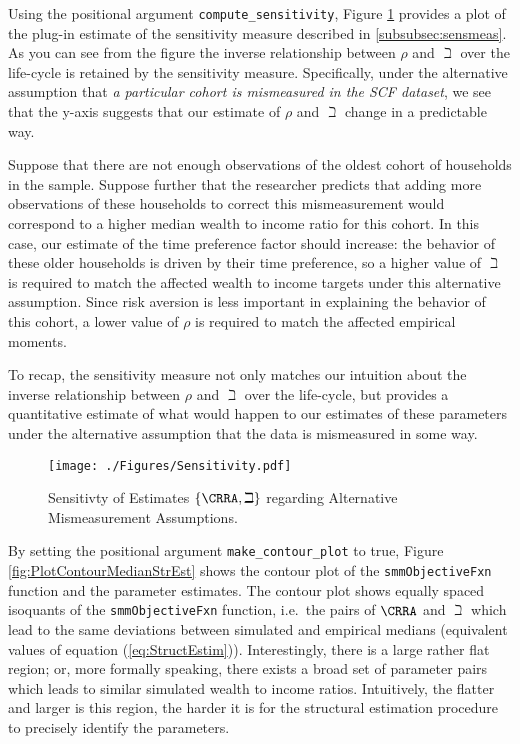 \documentclass[titlepage, headings=optiontotocandhead]{Resources/texmf-local/tex/latex/econtex}
\begin{document}
Using the positional argument \texttt{compute\_sensitivity}, Figure \ref{fig:PlotSensitivityMeasure} provides a plot of the plug-in estimate of the sensitivity measure described in \ref{subsubsec:sensmeas}. As you can see from the figure the inverse relationship between $\rho$ and $\beth$ over the life-cycle is retained by the sensitivity measure. Specifically, under the alternative assumption that \textit{a particular cohort is mismeasured in the SCF dataset}, we see that the y-axis suggests that our estimate of $\rho$ and $\beth$ change in a predictable way.

Suppose that there are not enough observations of the oldest cohort of households in the sample. Suppose further that the researcher predicts that adding more observations of these households to correct this mismeasurement would correspond to a higher median wealth to income ratio for this cohort. In this case, our estimate of the time preference factor should increase: the behavior of these older households is driven by their time preference, so a higher value of $\beth$ is required to match the affected wealth to income targets under this alternative assumption. Since risk aversion is less important in explaining the behavior of this cohort, a lower value of $\rho$ is required to match the affected empirical moments.

To recap, the sensitivity measure not only matches our intuition about the inverse relationship between $\rho$ and $\beth$ over the life-cycle, but provides a quantitative estimate of what would happen to our estimates of these parameters under the alternative assumption that the data is mismeasured in some way.

\hypertarget{PlotSensitivityMeasure}{}
\begin{figure}
  \texttt{[image: ./Figures/Sensitivity.pdf]}
  \caption{Sensitivty of Estimates $\{\CRRA,{\beth}\}$ regarding Alternative Mismeasurement Assumptions.}
  \label{fig:PlotSensitivityMeasure}
\end{figure}

By setting the positional argument \texttt{make\_contour\_plot} to true, Figure \ref{fig:PlotContourMedianStrEst} shows the contour plot of the \texttt{smmObjectiveFxn} function and the parameter estimates. The contour plot shows equally spaced isoquants of the \texttt{smmObjectiveFxn} function, i.e.\ the pairs of $\CRRA$ and ${\beth}$ which lead to the same deviations between simulated and empirical medians (equivalent values of equation (\ref{eq:StructEstim})). Interestingly, there is a large rather flat region; or, more formally speaking, there exists a broad set of parameter pairs which leads to similar simulated wealth to income ratios. Intuitively, the flatter and larger is this region, the harder it is for the structural estimation procedure to precisely identify the parameters.
\end{document}
